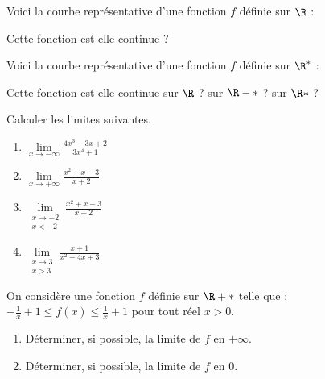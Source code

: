 %
%
%
\begin{exr}
Voici la courbe représentative d'une fonction $f$ définie sur $\R$ :
\begin{centered}
\end{centered}

Cette fonction est-elle continue ?
\end{exr}

%
%
%
\begin{exr}
Voici la courbe représentative d'une fonction $f$ définie sur $\R^*$ :
\begin{centered}
\end{centered}

Cette fonction est-elle continue sur $\R$ ? sur $\R-*$ ? sur $\R*$ ?
\end{exr}

\begin{exr}
Calculer les limites suivantes.
	\begin{enumerate}
	\item $\lim\limits_{x\to-\infty}\frac{4x^3-3x+2}{3x^4+1}$
	\item $\lim\limits_{x \to +\infty}\frac{x^2+x-3}{x+2}$
	\item $\lim\limits_{\substack{x\to -2\\x<-2}}\frac{x^2+x-3}{x+2}$
	\item $\lim\limits_{\substack{x\to 3\\x>3}}\frac{x+1}{x^2-4x+3}$
	\end{enumerate}
\end{exr}

\begin{exr}
On considère une fonction $f$ définie sur $\R+*$ telle que : $-\frac1x+1\leqslant f(x)\leqslant \frac1x+1$ pour tout réel $x>0$.
	\begin{enumerate}
	\item Déterminer, si possible, la limite de $f$ en $+\infty$.
	\item Déterminer, si possible, la limite de $f$ en $0$.
	\end{enumerate}
\end{exr}

